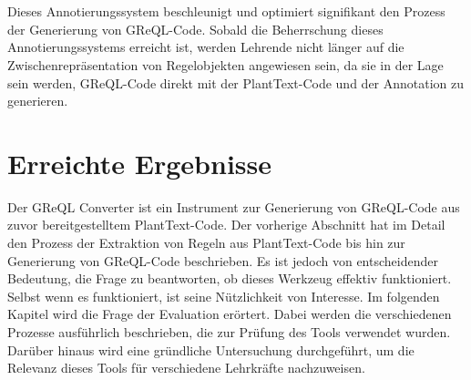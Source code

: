 \\~\\
Dieses Annotierungssystem beschleunigt und optimiert signifikant den Prozess der Generierung von GReQL-Code. Sobald
die Beherrschung dieses Annotierungssystems erreicht ist, werden Lehrende nicht länger auf die Zwischenrepräsentation
von Regelobjekten angewiesen sein, da sie in der Lage sein werden, GReQL-Code direkt mit der PlantText-Code und der
Annotation zu generieren.

\section{Erreichte Ergebnisse}

Der GReQL Converter ist ein Instrument zur Generierung von GReQL-Code aus zuvor bereitgestelltem PlantText-Code. Der
vorherige Abschnitt hat im Detail den Prozess der Extraktion von Regeln aus PlantText-Code bis hin zur Generierung
von GReQL-Code beschrieben. Es ist jedoch von entscheidender Bedeutung, die Frage zu beantworten, ob dieses Werkzeug
effektiv funktioniert. Selbst wenn es funktioniert, ist seine Nützlichkeit von Interesse. Im folgenden Kapitel wird
die Frage der Evaluation erörtert. Dabei werden die verschiedenen Prozesse ausführlich beschrieben, die zur Prüfung
des Tools verwendet wurden. Darüber hinaus wird eine gründliche Untersuchung durchgeführt, um die Relevanz dieses
Tools für verschiedene Lehrkräfte nachzuweisen.
